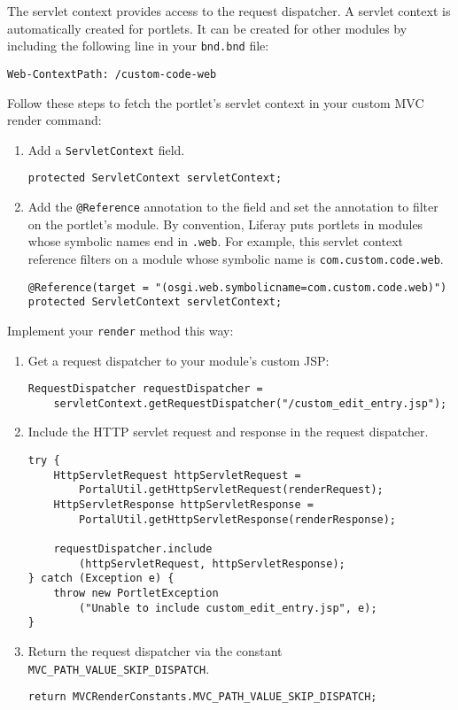 The servlet context provides access to the request dispatcher. A servlet
context is automatically created for portlets. It can be created for
other modules by including the following line in your \texttt{bnd.bnd}
file:

\begin{verbatim}
Web-ContextPath: /custom-code-web
\end{verbatim}

Follow these steps to fetch the portlet's servlet context in your custom
MVC render command:

\begin{enumerate}
\def\labelenumi{\arabic{enumi}.}
\item
  Add a \texttt{ServletContext} field.

\begin{verbatim}
protected ServletContext servletContext;
\end{verbatim}
\item
  Add the \texttt{@Reference} annotation to the field and set the
  annotation to filter on the portlet's module. By convention, Liferay
  puts portlets in modules whose symbolic names end in \texttt{.web}.
  For example, this servlet context reference filters on a module whose
  symbolic name is \texttt{com.custom.code.web}.

\begin{verbatim}
@Reference(target = "(osgi.web.symbolicname=com.custom.code.web)")
protected ServletContext servletContext;
\end{verbatim}
\end{enumerate}

Implement your \texttt{render} method this way:

\begin{enumerate}
\def\labelenumi{\arabic{enumi}.}
\item
  Get a request dispatcher to your module's custom JSP:

\begin{verbatim}
RequestDispatcher requestDispatcher =
    servletContext.getRequestDispatcher("/custom_edit_entry.jsp");
\end{verbatim}
\item
  Include the HTTP servlet request and response in the request
  dispatcher.

\begin{verbatim}
try {
    HttpServletRequest httpServletRequest = 
        PortalUtil.getHttpServletRequest(renderRequest);
    HttpServletResponse httpServletResponse = 
        PortalUtil.getHttpServletResponse(renderResponse);

    requestDispatcher.include
        (httpServletRequest, httpServletResponse);
} catch (Exception e) {
    throw new PortletException
        ("Unable to include custom_edit_entry.jsp", e);
}
\end{verbatim}
\item
  Return the request dispatcher via the constant
  \texttt{MVC\_PATH\_VALUE\_SKIP\_DISPATCH}.

\begin{verbatim}
return MVCRenderConstants.MVC_PATH_VALUE_SKIP_DISPATCH;
\end{verbatim}
\end{enumerate}

